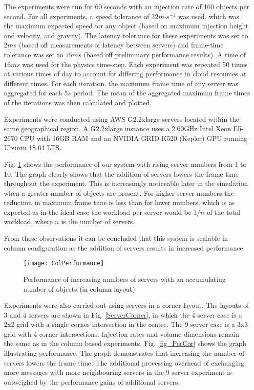 The experiments were run for 60 seconds with an injection rate of 160 objects per second. For all experiments, a speed tolerance of $32m\mathord{\cdot}s^{-1}$ was used, which was the maximum expected speed for any object (based on maximum injection height and velocity, and gravity). The latency tolerance for these experiments was set to $2ms$ (based off measurements of latency between servers) and frame-time tolerance was set to $15ms$ (based off preliminary performance results). A time of $16ms$ was used for the physics time-step. Each experiment was repeated 50 times at various times of day to account for differing performance in cloud resources at different times. For each iteration, the maximum frame time of any server was aggregated for each $5s$ period. The mean of the aggregated maximum frame times of the iterations was then calculated and plotted.

Experiments were conducted using AWS G2.2xlarge servers located within the same geographical region. A G2.2xlarge instance uses a 2.60GHz Intel Xeon E5-2670 CPU with 16GB RAM and an NVIDIA GRID K520 (Kepler) GPU running Ubuntu 18.04 LTS.

Fig. \ref{fig_PerCol} shows the performance of our system with rising server numbers from 1 to 10. The graph clearly shows that the addition of servers lowers the frame time throughout the experiment. This is increasingly noticeable later in the simulation when a greater number of objects are present. For higher server numbers the reduction in maximum frame time is less than for lower numbers, which is as expected as in the ideal case the workload per server would be $1/n$ of the total workload, where $n$ is the number of servers. 

From these observations it can be concluded that this system is scalable in column configuration as the addition of servers results in increased performance.

\begin{figure}[!t]
	\centering
	\texttt{[image: ColPerformance]}
	\caption{Performance of increasing numbers of servers with an accumulating number of objects (in column layout)}
	\label{fig_PerCol}
\end{figure}

Experiments were also carried out using servers in a corner layout. The layouts of 3 and 4 servers are shown in Fig. \ref{ServerCorner}, in which the 4 server case is a 2x2 grid with a single corner intersection in the centre. The 9 server case is a 3x3 grid with 4 corner intersections. Injection rates and volume dimensions remain the same as in the column based experiments. Fig. \ref{fig_PerCor} shows the graph illustrating performance. The graph demonstrates that increasing the number of servers lowers the frame time. The additional processing overhead of exchanging more messages with more neighbouring servers in the 9 server experiment is outweighed by the performance gains of additional servers.

